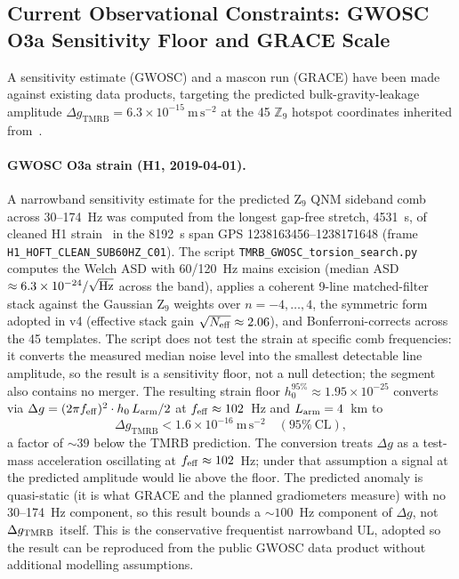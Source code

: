 \documentclass[11pt,a4paper]{article}
\begin{document}
\subsection{Current Observational Constraints: GWOSC O3a Sensitivity Floor and GRACE Scale}
\label{sec:current_constraints}

A sensitivity estimate (GWOSC) and a mascon run (GRACE) have been made against
existing data products, targeting the predicted bulk-gravity-leakage amplitude $\Delta g_{\mathrm{TMRB}} = 6.3\times10^{-15}~\mathrm{m\,s^{-2}}$ at the
45 $\mathbb{Z}_9$ hotspot coordinates inherited from~\cite{BresslerBGL2026}.

\paragraph{GWOSC O3a strain (H1, 2019-04-01).}
A narrowband sensitivity estimate for the predicted Z$_9$ QNM sideband comb
across 30--174~Hz was computed from the longest gap-free stretch, 4531~s,
of cleaned H1 strain~\cite{GWOSC2021} in the 8192~s span GPS 1238163456--1238171648 (frame
\texttt{H1\_HOFT\_CLEAN\_SUB60HZ\_C01}). The script
\texttt{TMRB\_GWOSC\_torsion\_search.py} computes the Welch ASD with
60/120~Hz mains excision (median ASD $\approx 6.3\times10^{-24}/\sqrt{\rm Hz}$
across the band), applies a coherent 9-line matched-filter stack against the
Gaussian Z$_9$ weights over $n=-4,\dots,4$, the symmetric form adopted in v4 (effective stack gain
$\sqrt{N_{\rm eff}} \approx 2.06$), and Bonferroni-corrects across the 45
templates. The script does not test the strain at specific comb frequencies: it
converts the measured median noise level into the smallest detectable line
amplitude, so the result is a sensitivity floor, not a null detection; the segment
also contains no merger. The resulting strain floor $h_0^{95\%} \approx 1.95\times10^{-25}$
converts via $\Delta g = (2\pi f_{\rm eff})^2 \cdot h_0\,L_{\rm arm}/2$ at
$f_{\rm eff} \approx 102$~Hz and $L_{\rm arm} = 4$~km to
\begin{equation}
  \Delta g_{\mathrm{TMRB}} < 1.6\times10^{-16}~\mathrm{m\,s^{-2}}
  \quad (95\%~\mathrm{CL}),
  \label{eq:gwosc_ul}
\end{equation}
a factor of $\sim 39$ below the TMRB prediction. The conversion
treats $\Delta g$ as a test-mass acceleration oscillating at $f_{\rm eff}\approx
102$~Hz; under that assumption a signal at the predicted amplitude would lie
above the floor. The predicted anomaly is quasi-static (it is what GRACE and the
planned gradiometers measure) with no 30--174~Hz component, so this result bounds
a $\sim 100$~Hz component of $\Delta g$, not $\Delta g_{\rm TMRB}$ itself. This is the conservative frequentist narrowband UL, adopted so the result can be reproduced from the
public GWOSC data product without additional modelling assumptions.
\end{document}
